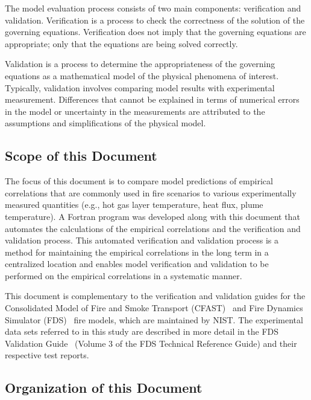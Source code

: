 \documentclass[11pt]{book}
\begin{document}
The model evaluation process consists of two main components: verification and validation. Verification is a process to check the correctness of the solution of the governing equations. Verification does not imply that the governing equations are appropriate; only that the equations are being solved correctly.

Validation is a process to determine the appropriateness of the governing equations as a mathematical model of the physical phenomena of interest. Typically, validation involves comparing model results with experimental measurement. Differences that cannot be explained in terms of numerical errors in the model or uncertainty in the measurements are attributed to the assumptions and simplifications of the physical model.

\subsection*{Scope of this Document}

The focus of this document is to compare model predictions of empirical correlations that are commonly used in fire scenarios to various experimentally measured quantities (e.g., hot gas layer temperature, heat flux, plume temperature). A Fortran program was developed along with this document that automates the calculations of the empirical correlations and the verification and validation process. This automated verification and validation process is a method for maintaining the empirical correlations in the long term in a centralized location and enables model verification and validation to be performed on the empirical correlations in a systematic manner.

This document is complementary to the verification and validation guides for the Consolidated Model of Fire and Smoke Transport (CFAST)~\cite{CFAST_Tech_Guide_6} and Fire Dynamics Simulator (FDS)~\cite{FDS_Verification_Guide, FDS_Validation_Guide} fire models, which are maintained by NIST. The experimental data sets referred to in this study are described in more detail in the FDS Validation Guide~\cite{FDS_Validation_Guide} (Volume 3 of the FDS Technical Reference Guide) and their respective test reports.


\clearpage


\subsection*{Organization of this Document}
\end{document}
